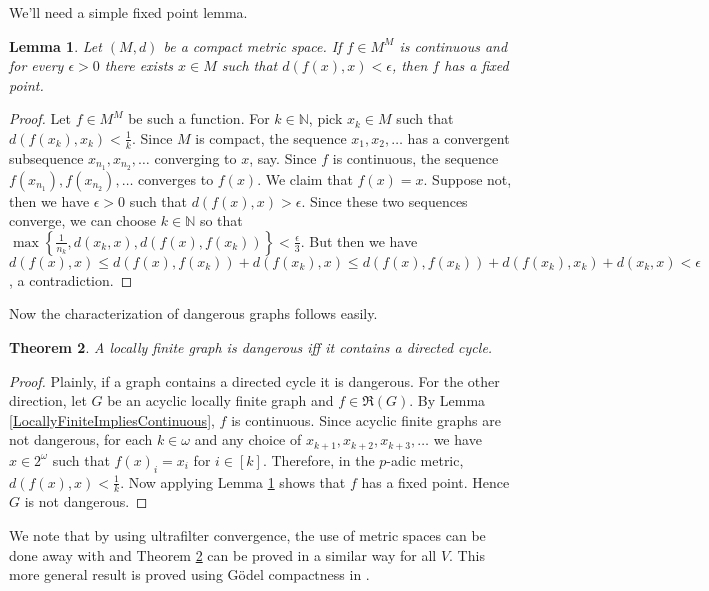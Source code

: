 \documentclass[12pt]{amsart}
\theoremstyle{plain}
\newtheorem{thm}{Theorem}
\newtheorem{lem}[thm]{Lemma}
\theoremstyle{definition}
\theoremstyle{remark}
\newcommand{\IN}{\mathbb{N}}
\newcommand{\R}{\mathfrak{R}}
\newcommand{\set}[1]{\left\{ #1 \right\}}
\newcommand{\irange}[1]{\left[#1\right]}
\begin{document}
We'll need a simple fixed point lemma.

\begin{lem}\label{SimpleFixedPoint}
Let $(M,d)$ be a compact metric space.  If $f \in M^M$ is continuous and for every $\epsilon > 0$ there exists $x \in M$ such that $d(f(x), x) < \epsilon$, then $f$ has a fixed point.
\end{lem}
\begin{proof}
Let $f \in M^M$ be such a function.  For $k \in \IN$, pick $x_k \in M$ such that $d(f(x_k), x_k) < \frac{1}{k}$.  Since $M$ is compact, the sequence $x_1, x_2, \ldots$ has a convergent subsequence $x_{n_1}, x_{n_2}, \ldots$ converging to $x$, say.  Since $f$ is continuous, the sequence $f(x_{n_1}), f(x_{n_2}), \ldots$ converges to $f(x)$. We claim that $f(x) = x$.  Suppose not, then we have $\epsilon >0$ such that $d(f(x), x) > \epsilon$.  Since these two sequences converge, we can choose $k \in \IN$ so that $\max\set{\frac{1}{n_k}, d(x_k, x), d(f(x), f(x_k))} < \frac{\epsilon}{3}$.  But then we have $d(f(x), x) \leq d(f(x), f(x_k)) + d(f(x_k), x) \leq d(f(x), f(x_k)) + d(f(x_k), x_k) + d(x_k, x) < \epsilon$, a contradiction.
\end{proof}

Now the characterization of dangerous graphs follows easily.

\begin{thm}\label{LocallyFinite}
A locally finite graph is dangerous iff it contains a directed cycle.
\end{thm}
\begin{proof}
Plainly, if a graph contains a directed cycle it is dangerous.  For the other direction, let $G$ be an acyclic locally finite graph and $f \in \R(G)$.  By Lemma \ref{LocallyFiniteImpliesContinuous}, $f$ is continuous. Since acyclic finite graphs are not dangerous, for each $k \in \omega$ and any choice of $x_{k+1}, x_{k+2}, x_{k+3}, \ldots$ we have $x \in 2^\omega$ such that $f(x)_i = x_i$ for $i \in \irange{k}$.  Therefore, in the $p$-adic metric, $d(f(x), x) < \frac{1}{k}$.  Now applying Lemma \ref{SimpleFixedPoint} shows that $f$ has a fixed point.  Hence $G$ is not dangerous.
\end{proof}

We note that by using ultrafilter convergence, the use of metric spaces can be done away with and Theorem \ref{LocallyFinite} can be proved in a similar way for all $V$.  This more general result is proved using G\"{o}del compactness in \cite{danger}.



\end{document}
